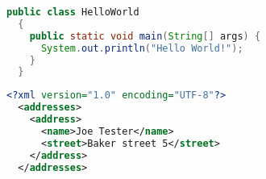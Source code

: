 \documentclass{article}
\begin{document}

\begin{lstlisting}[language=java]
  public class HelloWorld
  {
    public static void main(String[] args) {
      System.out.println("Hello World!");
    }
  }
\end{lstlisting}

\begin{lstlisting}[language=xml]
  <?xml version="1.0" encoding="UTF-8"?>
  <addresses>
    <address>
      <name>Joe Tester</name>
      <street>Baker street 5</street>
    </address>
  </addresses>
\end{lstlisting}
\end{document}
